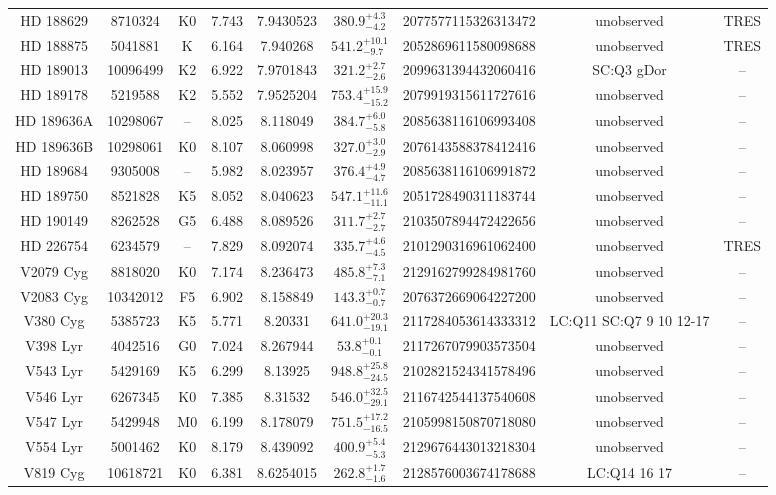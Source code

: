 \begin{table*}
\begin{tabular}{ccccccccc}
HD 188629 & 8710324 & K0 & 7.743 & 7.9430523 & $380.9^{+4.3}_{-4.2}$ & 2077577115326313472 & unobserved & TRES \\
HD 188875 & 5041881 & K & 6.164 & 7.940268 & $541.2^{+10.1}_{-9.7}$ & 2052869611580098688 & unobserved & TRES \\
HD 189013 & 10096499 & K2 & 6.922 & 7.9701843 & $321.2^{+2.7}_{-2.6}$ & 2099631394432060416 & SC:Q3 gDor & -- \\
HD 189178 & 5219588 & K2 & 5.552 & 7.9525204 & $753.4^{+15.9}_{-15.2}$ & 2079919315611727616 & unobserved & -- \\
HD 189636A & 10298067 & -- & 8.025 & 8.118049 & $384.7^{+6.0}_{-5.8}$ & 2085638116106993408 & unobserved & -- \\
HD 189636B & 10298061 & K0 & 8.107 & 8.060998 & $327.0^{+3.0}_{-2.9}$ & 2076143588378412416 & unobserved & -- \\
HD 189684 & 9305008 & -- & 5.982 & 8.023957 & $376.4^{+4.9}_{-4.7}$ & 2085638116106991872 & unobserved & -- \\
HD 189750 & 8521828 & K5 & 8.052 & 8.040623 & $547.1^{+11.6}_{-11.1}$ & 2051728490311183744 & unobserved & -- \\
HD 190149 & 8262528 & G5 & 6.488 & 8.089526 & $311.7^{+2.7}_{-2.7}$ & 2103507894472422656 & unobserved & -- \\
HD 226754 & 6234579 & -- & 7.829 & 8.092074 & $335.7^{+4.6}_{-4.5}$ & 2101290316961062400 & unobserved & TRES \\
V2079 Cyg & 8818020 & K0 & 7.174 & 8.236473 & $485.8^{+7.3}_{-7.1}$ & 2129162799284981760 & unobserved & -- \\
V2083 Cyg & 10342012 & F5 & 6.902 & 8.158849 & $143.3^{+0.7}_{-0.7}$ & 2076372669064227200 & unobserved & -- \\
V380 Cyg & 5385723 & K5 & 5.771 & 8.20331 & $641.0^{+20.3}_{-19.1}$ & 2117284053614333312 & LC:Q11 SC:Q7 9 10 12-17 & -- \\
V398 Lyr & 4042516 & G0 & 7.024 & 8.267944 & $53.8^{+0.1}_{-0.1}$ & 2117267079903573504 & unobserved & -- \\
V543 Lyr & 5429169 & K5 & 6.299 & 8.13925 & $948.8^{+25.8}_{-24.5}$ & 2102821524341578496 & unobserved & -- \\
V546 Lyr & 6267345 & K0 & 7.385 & 8.31532 & $546.0^{+32.5}_{-29.1}$ & 2116742544137540608 & unobserved & -- \\
V547 Lyr & 5429948 & M0 & 6.199 & 8.178079 & $751.5^{+17.2}_{-16.5}$ & 2105998150870718080 & unobserved & -- \\
V554 Lyr & 5001462 & K0 & 8.179 & 8.439092 & $400.9^{+5.4}_{-5.3}$ & 2129676443013218304 & unobserved & -- \\
V819 Cyg & 10618721 & K0 & 6.381 & 8.6254015 & $262.8^{+1.7}_{-1.6}$ & 2128576003674178688 & LC:Q14 16 17 & -- \\
\hline
\end{tabular}
\end{table*}
